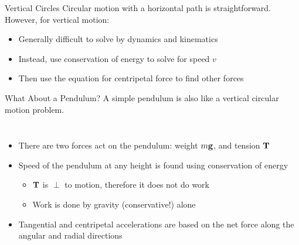 \documentclass[12pt,compress,aspectratio=169]{beamer}
\newcommand{\mb}[1]{\ensuremath\mathbf{#1}}
\begin{document}
\begin{frame}{Vertical Circles}
  Circular motion with a horizontal path is straightforward. However, for
  vertical motion:
  \begin{itemize}
  \item Generally difficult to solve by dynamics and kinematics
  \item Instead, use conservation of energy to solve for speed $v$
  \item Then use the equation for centripetal force to find other forces
  \end{itemize}
\end{frame}



\begin{frame}{What About a Pendulum?}
  A simple pendulum is also like a vertical circular motion problem.

  \vspace{.1in}\begin{columns}

    \begin{itemize}
    \item There are two forces act on the pendulum: weight $m\mb{g}$, and
    tension $\mb{T}$
    \item Speed of the pendulum at any height is found using conservation
      of energy
      \begin{itemize}
      \item $\mb{T}$ is $\perp$ to motion, therefore it does not do work
      \item Work is done by gravity (conservative!) alone
      \end{itemize}
    \item Tangential and centripetal accelerations are based on the net force
      along the angular and radial directions
    \end{itemize}
  \end{columns}
\end{frame}
\end{document}
